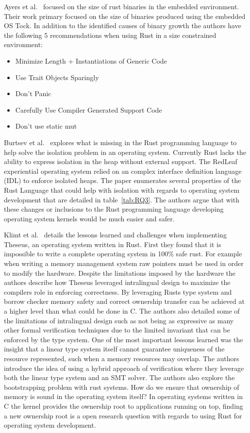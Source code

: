 \documentclass[sigconf]{acmart}
\begin{document}
Ayers et al.~\cite{Ayers2022-sf} focused on the size of rust binaries in the embedded environment. Their work primary focused on the size of binaries produced using the embedded OS Tock. In addition to the identified causes of binary growth the authors have the following 5 recommendations when using Rust in a size constrained environment:
\begin{itemize}
  \item Minimize Length + Instantiations of Generic Code
  \item Use Trait Objects Sparingly
  \item Don't Panic
  \item Carefully Use Compiler Generated Support Code
  \item Don't use static mut
\end{itemize}

Burtsev et al.~\cite{Burtsev2021-mh} explores what is missing in the Rust programming language to help solve the isolation problem in an operating system. Currently Rust lacks the ability to express isolation in the heap without external support. The RedLeaf experiential operating system relied on an complex interface definition language (IDL) to enforce isolated heaps. The paper enumerates several properties of the Rust Language that could help with isolation with regards to operating system development that are detailed in table~\ref{tab:RQ3}. The authors argue that with these changes or inclusions to the Rust programming language developing operating system kernels would be much easier and safer.

Klimt et al.~\cite{Klimt2023-ob} details the lessons learned and challenges when implementing Theseus, an operating system written in Rust. First they found that it is impossible to write a complete operating system in 100\% safe rust. For example when writing a memory management system raw pointers must be used in order to modify the hardware. Despite the limitations imposed by the hardware the authors describe how Theseus leveraged intralingual design to maximize the compilers role in enforcing correctness. By leveraging Rusts type system and borrow checker memory safety and correct ownership transfer can be achieved at a higher level than what could be done in C. The authors also detailed some of the limitations of intralingual design such as not being as expressive as many other formal verification techniques due to the limited invariant that can be enforced by the type system. One of the most important lessons learned was the insight that a linear type system itself cannot guarantee uniqueness of the resource represented, such when a memory resources may overlap. The authors introduce the idea of using a hybrid approach of verification where they leverage both the linear type system and an SMT solver. The authors also explore the bootstrapping problem with rust systems. How do we ensure that ownership of memory is sound in the operating system itself? In operating systems written in C the kernel provides the ownership root to applications running on top, finding a new ownership root is a open research question with regards to using Rust for operating system development.
\end{document}
